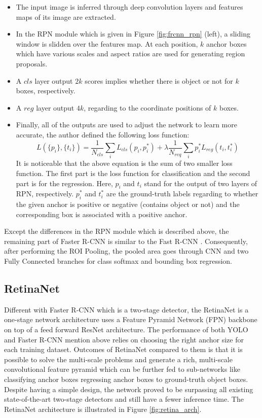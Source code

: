 \begin{itemize}
    \item The input image is inferred through deep convolution layers and features maps of its image are extracted.
    \item In the RPN module which is given in Figure \ref{fig:frcnn_rpn} (left), a sliding window is slidden over the features map. At each position, $k$ anchor boxes which have various scales and aspect ratios are used for generating region proposals.
    \item A $cls$ layer output $2k$ scores implies whether there is object or not for $k$ boxes, respectively.
    \item A $reg$ layer  output $4k$, regarding to the coordinate positions of $k$ boxes.
    \item Finally, all of the outputs are used to adjust the network to learn more accurate, the author defined the following loss function:
    \begin{equation}
        L(\{p_i\}, \{t_i\}) = \dfrac{1}{N_{cls}}\sum_{i} L_{cls}(p_i, p_i^{*}) + \lambda\dfrac{1}{N_{req}}\sum_{i}p_i^{*}L_{reg}(t_i, t_i^{*})
    \end{equation}
    It is noticeable that the above equation is the sum of two smaller loss function. The first part is the loss function for classification and the second part is for the regression. Here, $p_i$ and $t_i$ stand for the output of two layers of RPN, respectively. $p_i^{*}$ and $t_i^{*}$ are the ground-truth labels regarding to whether the given anchor is positive or negative (contains object or not) and the corresponding box is associated with a positive anchor.
\end{itemize}

Except the differences in the RPN module which is described above, the remaining part of Faster R-CNN is similar to the Fast R-CNN \cite{FastRCNN}. Consequently, after performing the ROI Pooling, the pooled area goes through CNN and two Fully Connected branches for class softmax and bounding box regression.

\subsection{RetinaNet}
Different with Faster R-CNN which is a two-stage detector, the RetinaNet  \cite{Retina} is a one-stage network architecture uses a Feature Pyramid Network (FPN) \cite{FPN} backbone on top of a feed forward ResNet architecture. The performance of both YOLO and Faster R-CNN mention above relies on choosing the right anchor size for each training dataset. Outcomes of RetinaNet compared to them is that it is possible to solve the multi-scale problems and generate a rich, multi-scale convolutional feature pyramid which can be further fed to sub-networks like classifying anchor boxes regressing anchor boxes to ground-truth object boxes. Despite having a simple design, the network proved to be surpassing all existing state-of-the-art two-stage detectors and still have a fewer inference time. The RetinaNet architecture is illustrated in Figure \ref{fig:retina_arch}.

